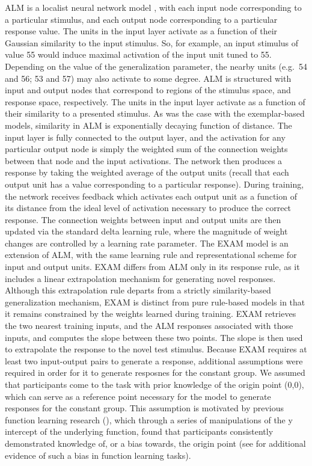 \documentclass[
  12pt,
  letterpaper,
]{article}
\begin{document}
ALM is a localist neural network model
\autocite{pageConnectionistModellingPsychology2000a}, with each input
node corresponding to a particular stimulus, and each output node
corresponding to a particular response value. The units in the input
layer activate as a function of their Gaussian similarity to the input
stimulus. So, for example, an input stimulus of value 55 would induce
maximal activation of the input unit tuned to 55. Depending on the value
of the generalization parameter, the nearby units (e.g.~54 and 56; 53
and 57) may also activate to some degree. ALM is structured with input
and output nodes that correspond to regions of the stimulus space, and
response space, respectively. The units in the input layer activate as a
function of their similarity to a presented stimulus. As was the case
with the exemplar-based models, similarity in ALM is exponentially
decaying function of distance. The input layer is fully connected to the
output layer, and the activation for any particular output node is
simply the weighted sum of the connection weights between that node and
the input activations. The network then produces a response by taking
the weighted average of the output units (recall that each output unit
has a value corresponding to a particular response). During training,
the network receives feedback which activates each output unit as a
function of its distance from the ideal level of activation necessary to
produce the correct response. The connection weights between input and
output units are then updated via the standard delta learning rule,
where the magnitude of weight changes are controlled by a learning rate
parameter. The EXAM model is an extension of ALM, with the same learning
rule and representational scheme for input and output units. EXAM
differs from ALM only in its response rule, as it includes a linear
extrapolation mechanism for generating novel responses. Although this
extrapolation rule departs from a strictly similarity-based
generalization mechanism, EXAM is distinct from pure rule-based models
in that it remains constrained by the weights learned during training.
EXAM retrieves the two nearest training inputs, and the ALM responses
associated with those inputs, and computes the slope between these two
points. The slope is then used to extrapolate the response to the novel
test stimulus. Because EXAM requires at least two input-output pairs to
generate a response, additional assumptions were required in order for
it to generate resposnes for the constant group. We assumed that
participants come to the task with prior knowledge of the origin point
(0,0), which can serve as a reference point necessary for the model to
generate responses for the constant group. This assumption is motivated
by previous function learning research
(\textcite{brownUnderestimationLinearFunction2017}), which through a
series of manipulations of the y intercept of the underlying function,
found that participants consistently demonstrated knowledge of, or a
bias towards, the origin point (see
\textcite{kwantesWhyPeopleUnderestimate2006} for additional evidence of
such a bias in function learning tasks).
\end{document}
